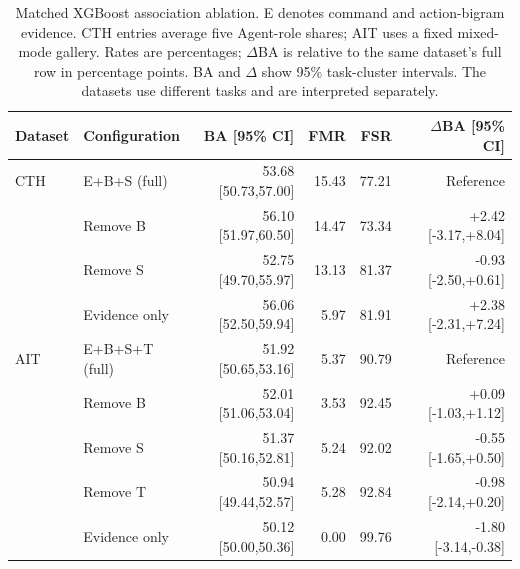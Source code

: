 
\begin{table}[ht]
\centering\compacttable
\caption{Matched XGBoost association ablation. E denotes command and action-bigram evidence. CTH entries average five Agent-role shares; AIT uses a fixed mixed-mode gallery. Rates are percentages; $\Delta$BA is relative to the same dataset's full row in percentage points. BA and $\Delta$ show 95\% task-cluster intervals. The datasets use different tasks and are interpreted separately.}
\label{tab:matched-fingerprint-ablation}
\begin{tabular*}{\linewidth}{@{\extracolsep{\fill}}llrrrr@{}}
\toprule
Dataset & Configuration & BA [95\% CI] & FMR & FSR & $\Delta$BA [95\% CI] \\
\midrule
CTH & E+B+S (full) & 53.68 [50.73,57.00] & 15.43 & 77.21 & Reference \\
 & Remove B & 56.10 [51.97,60.50] & 14.47 & 73.34 & +2.42 [-3.17,+8.04] \\
 & Remove S & 52.75 [49.70,55.97] & 13.13 & 81.37 & -0.93 [-2.50,+0.61] \\
 & Evidence only & 56.06 [52.50,59.94] & 5.97 & 81.91 & +2.38 [-2.31,+7.24] \\
\midrule
AIT & E+B+S+T (full) & 51.92 [50.65,53.16] & 5.37 & 90.79 & Reference \\
 & Remove B & 52.01 [51.06,53.04] & 3.53 & 92.45 & +0.09 [-1.03,+1.12] \\
 & Remove S & 51.37 [50.16,52.81] & 5.24 & 92.02 & -0.55 [-1.65,+0.50] \\
 & Remove T & 50.94 [49.44,52.57] & 5.28 & 92.84 & -0.98 [-2.14,+0.20] \\
 & Evidence only & 50.12 [50.00,50.36] & 0.00 & 99.76 & -1.80 [-3.14,-0.38] \\
\bottomrule
\end{tabular*}
\end{table}
